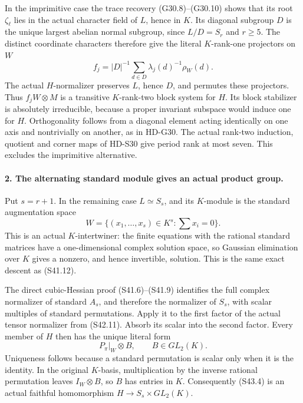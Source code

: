 In the imprimitive case the trace recovery (G30.8)--(G30.10)
shows that its root \(\zeta_\ell\) lies in the actual
character field of \(L\), hence in \(K\).
Its diagonal subgroup \(D\) is the unique largest abelian
normal subgroup, since \(L/D=S_r\) and \(r\ge5\).
The distinct coordinate characters therefore give the literal
\(K\)-rank-one projectors on \(W\)
\[
       f_j=|D|^{-1}\sum_{d\in D}
                          \lambda_j(d)^{-1}\rho_W(d).
                                                               \tag{S43.2}
\]
The actual \(H\)-normalizer preserves \(L\), hence
\(D\), and permutes these projectors. Thus
\(f_jW\otimes M\) is a transitive \(K\)-rank-two
block system for \(H\). Its block stabilizer is absolutely
irreducible, because a proper invariant subspace would induce
one for \(H\). Orthogonality follows from a diagonal
element acting identically on one axis and nontrivially on
another, as in HD-G30. The actual rank-two induction,
quotient and corner maps of HD-S30 give period rank at most
seven. This excludes the imprimitive alternative.

\paragraph{2. The alternating standard module gives an actual product group.}
Put \(s=r+1\). In the remaining case \(L\simeq S_s\),
and its \(K\)-module is the standard augmentation space
\[
                    W=\{(x_1,\ldots,x_s)\in K^s:
                                             \sum x_i=0\}.
                                                               \tag{S43.3}
\]
This is an actual \(K\)-intertwiner: the finite equations
with the rational standard matrices have a one-dimensional
complex solution space, so Gaussian elimination over \(K\)
gives a nonzero, and hence invertible, solution. This is the
same exact descent as (S41.12).

The direct cubic-Hessian proof (S41.6)--(S41.9) identifies
the full complex normalizer of standard \(A_s\), and
therefore the normalizer of \(S_s\), with scalar multiples
of standard permutations. Apply it to the first factor of
the actual tensor normalizer from (S42.11). Absorb its
scalar into the second factor. Every member of \(H\)
then has the unique literal form
\[
                         P_\pi|_W\otimes B,
                                \qquad B\in GL_2(K).       \tag{S43.4}
\]
Uniqueness follows because a standard permutation is scalar
only when it is the identity. In the original \(K\)-basis,
multiplication by the inverse rational permutation leaves
\(I_W\otimes B\), so \(B\) has entries in \(K\).
Consequently (S43.4) is an actual faithful homomorphism
\(H\to S_s\times GL_2(K)\).


